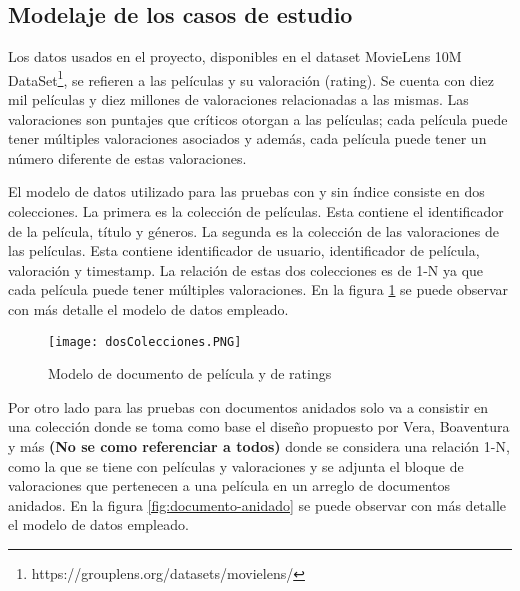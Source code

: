 \documentclass[conference,compsoc]{sty/IEEEtran}
\begin{document}


\subsection{Modelaje de los casos de estudio}
Los datos usados en el proyecto, disponibles en el dataset MovieLens 10M DataSet\footnote{https://grouplens.org/datasets/movielens/}, se refieren a las películas y su valoración (rating). Se cuenta con  diez mil películas y diez millones de valoraciones relacionadas a las mismas. Las valoraciones son puntajes que críticos otorgan a las películas; cada película puede tener múltiples valoraciones asociados y además, cada película puede tener un número diferente de estas valoraciones.

El modelo de datos utilizado para las pruebas con y sin índice consiste en dos colecciones. La primera es la colección de películas. Esta contiene el identificador de la película, título y géneros. La segunda es la colección de las valoraciones de las películas. Esta contiene identificador de usuario, identificador de película, valoración y timestamp. La relación de estas dos colecciones es de 1-N ya que cada película puede tener múltiples valoraciones. En la figura \ref{fig:pelicula-rating} se puede observar con más detalle el modelo de datos empleado.


\begin{figure}
\begin{center}
\texttt{[image: dosColecciones.PNG]}
\end{center}
\caption{Modelo de documento de película y de ratings} 
\label{fig:pelicula-rating}
\end{figure}

Por otro lado para las pruebas con documentos anidados solo va a consistir en una colección donde se toma como base el diseño propuesto por Vera, Boaventura y más \textbf{(No se como referenciar a todos)} \cite{VeraBoa} donde se considera una relación 1-N, como la que se tiene con películas y valoraciones y se adjunta el bloque de valoraciones que pertenecen a una película en un arreglo de documentos anidados. En la figura \ref{fig:documento-anidado} se puede observar con más detalle el modelo de datos empleado.
\end{document}
